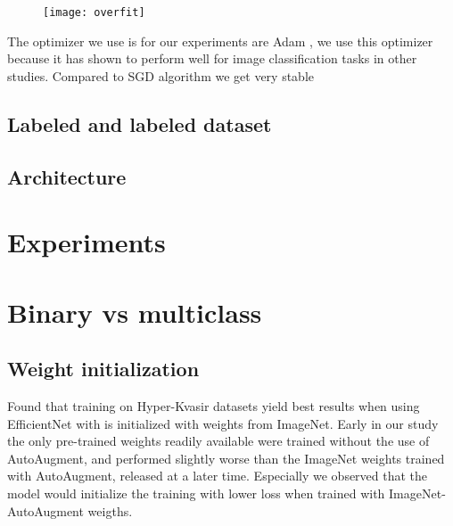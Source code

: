 \documentclass[thesis.tex]{subfiles}
\begin{document}
\begin{figure} %
  \begin{center}
    \texttt{[image: overfit]}
    \caption[]{}
    \label{fig:overfit}
  \end{center}
\end{figure}

The optimizer we use is for our experiments are Adam \cite{AdamMethod17}, we use this optimizer because it has shown to perform well for image classification tasks in other studies. Compared to SGD algorithm we get very stable 


\subsection{Labeled and labeled dataset}


\subsection{Architecture}




\section{Experiments}
%


\section{Binary vs multiclass}



\subsection{Weight initialization}
Found that training on Hyper-Kvasir datasets yield best results when using EfficientNet with is initialized with weights from ImageNet. Early in our study the only pre-trained weights readily available were trained without the use of AutoAugment, and performed slightly worse than the ImageNet weights trained with AutoAugment, released at a later time. Especially we observed that the model would initialize the training with lower loss when trained with ImageNet-AutoAugment weigths.
\end{document}
